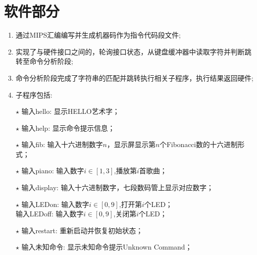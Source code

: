 \section{软件部分}
\begin{enumerate}
    \item 通过MIPS汇编编写并生成机器码作为指令代码段文件;
    \item 实现了与硬件接口之间的，轮询接口状态，从键盘缓冲器中读取字符并判断跳转至命令分析阶段;
    \item 命令分析阶段完成了字符串的匹配并跳转执行相关子程序，执行结果返回硬件;
    \item 子程序包括:
    \item[\color{yellow}$\star$]输入hello: 显示HELLO艺术字；
    \item[\color{yellow}$\star$]输入help: 显示命令提示信息；
    \item[\color{yellow}$\star$]输入fib: 输入十六进制数字$n$，显示屏显示第$n$个Fibonacci数的十六进制形式；
    \item[\color{yellow}$\star$]输入piano: 输入数字$i\in [1,3]$,播放第$i$首歌曲；
    \item[\color{yellow}$\star$]输入display: 输入十六进制数字，七段数码管上显示对应数字；
    \item[\color{yellow}$\star$]输入LEDon: 输入数字$i\in [0,9]$,打开第$i$个LED；
                            \\输入LEDoff: 输入数字$i\in [0,9]$,关闭第$i$个LED；
    \item[\color{yellow}$\star$]输入restart: 重新启动并恢复初始状态；
    \item[\color{yellow}$\star$]输入未知命令: 显示未知命令提示Unknown Command；
\end{enumerate}